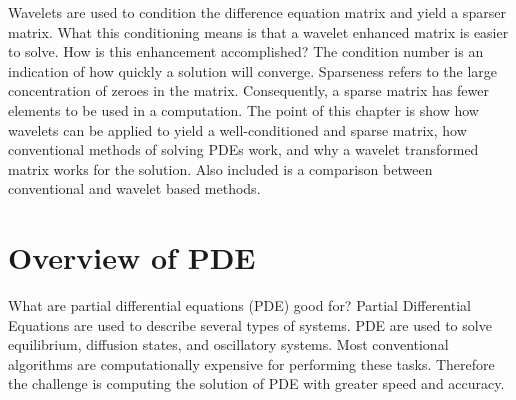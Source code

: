 
Wavelets are used to condition the difference equation matrix and yield a %
sparser matrix.  What this conditioning means is that a wavelet enhanced matrix is easier to solve.  How is this enhancement accomplished?  The condition number is an indication of how quickly a solution will converge.    Sparseness refers to the large concentration of zeroes in the matrix.  Consequently, a sparse matrix has fewer elements to be used in a computation.  The point of this chapter is show how wavelets can be applied to yield a well-conditioned and sparse matrix, how conventional methods of solving PDEs work,  and why a wavelet transformed matrix works for the solution.  Also included is a comparison between conventional and wavelet based methods.  


\section {Overview of PDE}
What are partial differential equations (PDE) good for?  
Partial Differential Equations are used to describe several types of systems.  
PDE are used to solve %
equilibrium, diffusion states, and oscillatory systems.  Most %
conventional algorithms are computationally expensive %
for performing these tasks.  Therefore the challenge is computing %
the solution of PDE with greater speed and accuracy.


